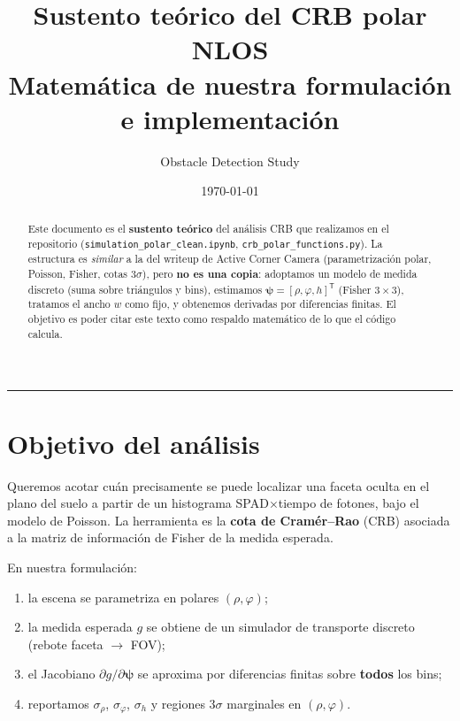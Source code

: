 \documentclass[11pt,a4paper]{article}
\title{Sustento te\'orico del CRB polar NLOS\\[4pt]
\large Matem\'atica de nuestra formulaci\'on e implementaci\'on}
\author{Obstacle Detection Study}
\date{\today}
\theoremstyle{definition}
\newcommand{\vect}[1]{\boldsymbol{#1}}
\begin{document}
\maketitle

\begin{abstract}
Este documento es el \textbf{sustento te\'orico} del an\'alisis CRB que realizamos
en el repositorio (\texttt{simulation\_polar\_clean.ipynb},
\texttt{crb\_polar\_functions.py}).
La estructura es \emph{similar} a la del writeup de Active Corner Camera
(parametrizaci\'on polar, Poisson, Fisher, cotas $3\sigma$), pero \textbf{no es
una copia}: adoptamos un modelo de medida discreto (suma sobre tri\'angulos y
bins), estimamos $\vect{\psi}=[\rho,\varphi,h]^{\mathsf T}$ (Fisher $3\times 3$),
tratamos el ancho $w$ como fijo, y obtenemos derivadas por diferencias finitas.
El objetivo es poder citar este texto como respaldo matem\'atico de lo que el
c\'odigo calcula.
\end{abstract}

\tableofcontents
\bigskip\hrule\bigskip

\section{Objetivo del an\'alisis}
\label{sec:objetivo}

Queremos acotar cu\'an precisamente se puede localizar una faceta oculta en el
plano del suelo a partir de un histograma SPAD$\times$tiempo de fotones,
bajo el modelo de Poisson. La herramienta es la \textbf{cota de Cram\'er--Rao}
(CRB) asociada a la matriz de informaci\'on de Fisher de la medida esperada.

En nuestra formulaci\'on:
\begin{enumerate}[nosep]
    \item la escena se parametriza en polares $(\rho,\varphi)$;
    \item la medida esperada $g$ se obtiene de un simulador de transporte
          discreto (rebote faceta $\to$ FOV);
    \item el Jacobiano $\partial g/\partial\vect{\psi}$ se aproxima por
          diferencias finitas sobre \textbf{todos} los bins;
    \item reportamos $\sigma_\rho$, $\sigma_\varphi$, $\sigma_h$ y regiones
          $3\sigma$ marginales en $(\rho,\varphi)$.
\end{enumerate}
\end{document}
